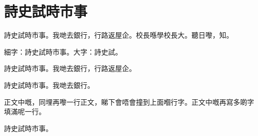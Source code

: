 \documentclass{article}
\begin{document}
\tableofcontents
\section{詩史試時市事}
\begin{jyutpingscope}
詩史試時市事。我哋去銀行，行路返屋企。校長喺學校長大。聽日嚟，知。

{\small 細字：詩史試時市事。}{\Large 大字：詩史試。}
\end{jyutpingscope}
\begin{jyutpingscope}[font=\sffamily, format=\itshape\color{blue}, width=natural]
詩史試時市事。我哋去銀行，行路返屋企。
\end{jyutpingscope}
\begin{jyutpingscope}[ratio=0.6, vsep=1.3em, width=2.2em]
詩史試時市事。我哋去銀行。
\end{jyutpingscope}
正文中嘅，同埋再嚟一行正文，睇下會唔會撞到上面嗰行字。正文中嘅再寫多啲字填滿呢一行。
\begin{jyutpingscope}[fancy=false]
詩史試時市事。
\end{jyutpingscope}
\end{document}
